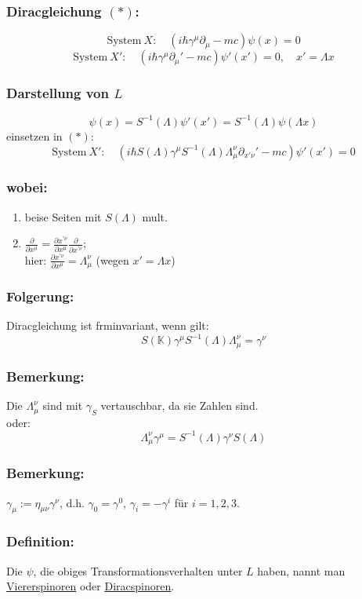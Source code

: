 \documentclass[twoside,a4paper]{scrartcl}
\newcommand{\K}{\mathbb{K}}
\renewcommand{\1}{\mathds{1}}
\renewcommand{\L}{\Lambda}
\begin{document}
\subsubsection*{Diracgleichung $(*)$:}
$$\mathrm{System} \ X: \quad (i\hbar \gamma^\mu \partial_\mu-mc)\psi(x)=0$$
$$\mathrm{System} \ X': \quad (i\hbar \gamma^\mu \partial_\mu'-mc)\psi'(x')=0, \quad x'=\L x$$
\subsubsection*{Darstellung von $L$}
$$\psi(x)=S^{-1}(\L) \psi'(x')=S^{-1}(\L)\psi(\L x)$$
einsetzen in $(*)$:
$$\mathrm{System} \ X': \quad (i\hbar S(\L)\gamma^\mu S^{-1}(\L) \L_\mu^\nu \partial_{x'\nu}'-mc)\psi'(x')=0$$
\subsubsection*{wobei:}
\begin{enumerate}
\item beise Seiten mit $S(\L)$ mult.
\item $\frac{\partial}{\partial x^\mu}=\frac{\partial x^{'\nu}}{\partial x^\mu}\frac{\partial}{\partial x^{'\nu}}$;\\
hier: $\frac{\partial x^{'\nu}}{\partial x^\mu}=\L_\mu^\nu$ (wegen $x'=\L x$)
\end{enumerate}
\subsubsection*{Folgerung:}
Diracgleichung ist frminvariant, wenn gilt:
$$S(\K) \gamma^\mu S^{-1}(\L) \L_\mu^\nu=\gamma^\nu$$
\subsubsection*{Bemerkung:}
Die $\L_\mu^\nu$ sind mit $\gamma_S$ vertauschbar, da sie Zahlen sind.\\
oder: $$\L_\mu^\nu \gamma^\mu=S^{-1}(\L)\gamma^\nu S(\L)$$
\subsubsection*{Bemerkung:}
$\gamma_\mu:=\eta_{\mu\nu}\gamma^\nu$, d.h. $\gamma_0=\gamma^0$, $\gamma_i=-\gamma^i$ für $i=1,2,3$.
\subsubsection*{Definition:}
Die $\psi$, die obiges Transformationsverhalten unter $L$ haben, nannt man \underline{Viererspinoren} oder \underline{Diracspinoren}.
\end{document}
